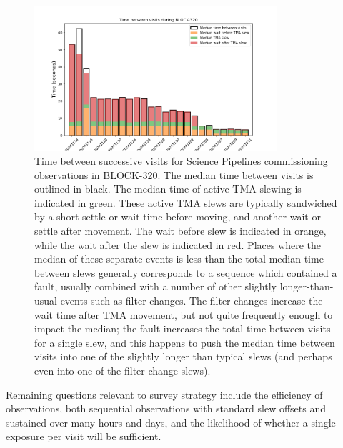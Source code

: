 \begin{figure}
    \centering
    \includegraphics[width=0.8\textwidth]{sp/TimeBetweenVisits.png}
    \caption{Time between successive visits for Science Pipelines commissioning observations in BLOCK-320. The median time between visits is outlined in black. The median time of active TMA slewing is indicated in green. These active TMA slews are typically sandwiched by a short settle or wait time before moving, and another wait or settle after movement. The wait before slew is indicated in orange, while the wait after the slew is indicated in red. Places where the median of these separate events is less than the total median time between slews generally corresponds to a sequence which contained a fault, usually combined with a number of other slightly longer-than-usual events such as filter changes. The filter changes increase the wait time after TMA movement, but not quite frequently enough to impact the median; the fault increases the total time between visits for a single slew, and this happens to push the median time between visits into one of the slightly longer than typical slews (and perhaps even into one of the filter change slews). }
    \label{fig:time_between_visits}
    \end{figure}


Remaining questions relevant to survey strategy include the efficiency of observations, both sequential observations with standard slew offsets and sustained over many hours and days, and the likelihood of whether a single exposure per visit will be sufficient.

